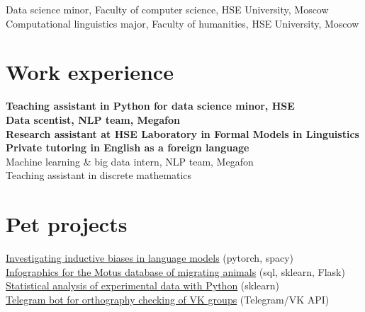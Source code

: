 \documentclass[11pt]{article} %
\begin{document}
 Data science minor, Faculty of computer science, HSE University, Moscow\\
 Computational linguistics major, Faculty of humanities, HSE University, Moscow


\section*{Work experience}

 \textbf{Teaching assistant in Python for data science minor, HSE}\\
 \textbf{Data scentist, NLP team, Megafon}\\
 \textbf{Research assistant at HSE Laboratory in Formal Models in Linguistics}\\
 \textbf{Private tutoring in English as a foreign language}\\
 {Machine learning \& big data intern, NLP team, Megafon}\\
Teaching assistant in discrete mathematics



\section*{Pet projects}

\href{https://github.com/thddbptnsndshs/LMindbiases}{Investigating inductive biases in language models} (pytorch, spacy)\\
\href{https://github.com/thddbptnsndshs/motustoday}{Infographics for the Motus database of migrating animals} (sql, sklearn, Flask)\\
\href{https://github.com/thddbptnsndshs/idioms}{Statistical analysis of experimental data with Python} (sklearn)\\
\href{https://github.com/thddbptnsndshs/nlzlkskprdstvtljsclnhgrppncnvfrmvgrppvk}{Telegram bot for orthography checking of VK groups} (Telegram/VK API)\\
\end{document}
